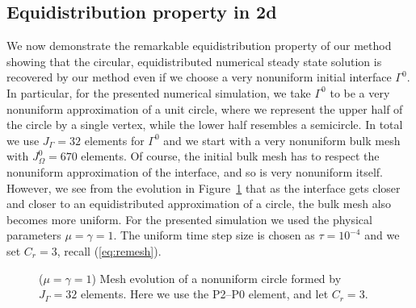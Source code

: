 \documentclass[a4paper,11pt,onecolumn]{article}
\begin{document}
\subsection{Equidistribution property in 2d}
We now demonstrate the remarkable equidistribution property of our method
showing that the circular, equidistributed numerical steady state solution is
recovered by our method even if we choose a very nonuniform initial interface
$\Gamma^0$. In particular, for the presented numerical simulation, we take
$\Gamma^0$ to be a very nonuniform approximation of a unit circle, where we
represent the upper half of the circle by a single vertex, while the lower half
resembles a semicircle. In total we use $J_\Gamma = 32$ elements for $\Gamma^0$
and we start with a very nonuniform bulk mesh with $J_\Omega^0 = 670$ elements.
Of course, the initial bulk mesh has to respect the nonuniform approximation
of the interface, and so is very nonuniform itself. However, we see from the
evolution in Figure~\ref{fig:nonuniform_bubble_32_both} that as the interface
gets closer and closer to an equidistributed approximation of a circle, the
bulk mesh also becomes more uniform. For the presented simulation we used the
physical parameters $\mu= \gamma=1$. The uniform time step size is chosen as
$\tau=10^{-4}$ and we set $C_r=3$, recall (\ref{eq:remesh}).
\begin{figure}[htbp]
\centering
{}
\caption{($\mu=\gamma=1$) Mesh evolution of a nonuniform circle formed by
$J_\Gamma = 32$ elements. Here we use the P2--P0 element, and let $C_r = 3$.}
\label{fig:nonuniform_bubble_32_both}
\end{figure}
\end{document}
